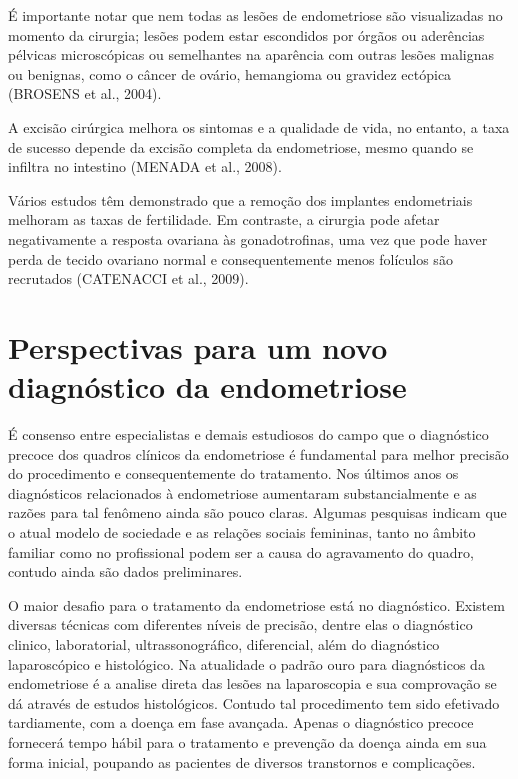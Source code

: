 \documentclass[12pt]{article} %
\begin{document}
É importante notar que nem todas as lesões de endometriose são
visualizadas no momento da cirurgia; lesões podem estar escondidos por
órgãos ou aderências pélvicas microscópicas ou semelhantes na
aparência com outras lesões malignas ou benignas, como o câncer de
ovário, hemangioma ou gravidez ectópica (BROSENS et al., 2004).

A excisão cirúrgica
melhora os sintomas e a qualidade de vida, no entanto, a taxa de
sucesso depende da excisão completa da endometriose, mesmo
quando se infiltra no intestino (MENADA et al., 2008).

Vários estudos têm demonstrado que a remoção dos implantes
endometriais melhoram as taxas de fertilidade. Em contraste, a
cirurgia pode afetar negativamente a resposta ovariana às gonadotrofinas, uma vez que pode haver perda de tecido ovariano normal e consequentemente menos folículos são recrutados (CATENACCI et al., 2009).


\section{Perspectivas para um novo diagnóstico da endometriose}



É consenso entre especialistas e demais estudiosos do campo que o diagnóstico precoce dos quadros clínicos da endometriose é fundamental para melhor precisão do procedimento e consequentemente do tratamento. Nos últimos anos os diagnósticos relacionados à endometriose aumentaram substancialmente e as razões para tal fenômeno ainda são pouco claras. Algumas pesquisas indicam que o atual modelo de sociedade e as relações sociais femininas, tanto no âmbito familiar como no profissional podem ser a causa do agravamento do quadro, contudo ainda são dados preliminares.

O maior desafio para o tratamento da endometriose está no diagnóstico. Existem diversas técnicas com diferentes níveis de precisão, dentre elas o diagnóstico clinico, laboratorial, ultrassonográfico, diferencial, além do diagnóstico laparoscópico e histológico.  Na atualidade o padrão ouro para diagnósticos da endometriose é a analise direta das lesões na laparoscopia e sua comprovação se dá através de estudos histológicos. Contudo tal procedimento tem sido efetivado tardiamente, com a doença em fase avançada. Apenas o diagnóstico precoce fornecerá tempo hábil para o tratamento e prevenção da doença ainda em sua forma inicial, poupando as pacientes de diversos transtornos e complicações.
\end{document}
